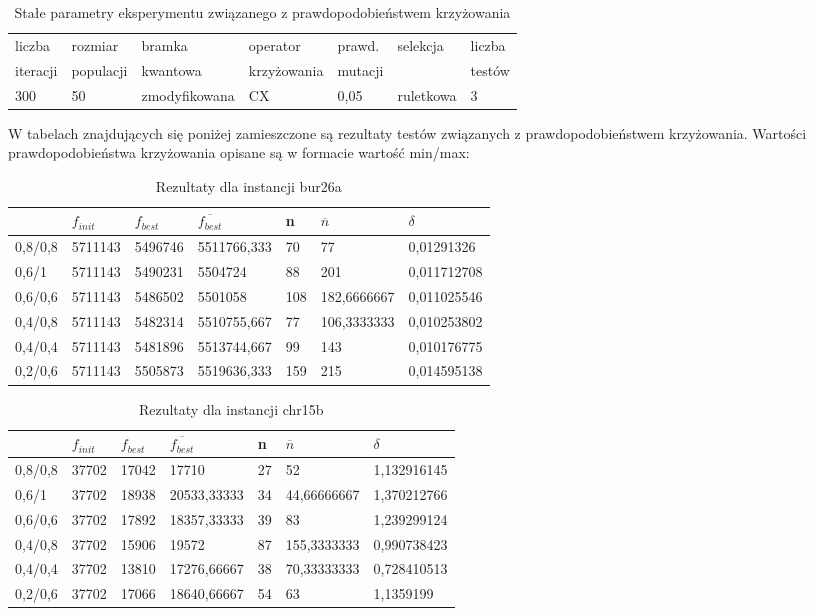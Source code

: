 \begin{table}[H]
\label{T3_params}
\begin{tabular}{l l l l l l l}
\hline
liczba & rozmiar & bramka & operator & prawd. & selekcja & liczba \\
iteracji & populacji & kwantowa & krzyżowania & mutacji & & testów \\
\hline
300 & 50 & zmodyfikowana & CX & 0,05 & ruletkowa & 3 \\
\hline
\end{tabular}
\caption{Stałe parametry eksperymentu związanego z prawdopodobieństwem krzyżowania}
\end{table}

W tabelach znajdujących się poniżej zamieszczone są rezultaty testów związanych z prawdopodobieństwem krzyżowania. Wartości prawdopodobieństwa krzyżowania opisane są w formacie wartość min/max:

\begin{table}[H]
\label{T3_bur26a}
\begin{tabular}{l l l l l l l}
\hline
 & $f_{init}$ & $f_{best}$ & $\overline{f_{best}}$ & n & $\overline{n}$ & $\delta$ \\
\hline
0,8/0,8 & 5711143 & 5496746 & 5511766,333 & 70 & 77 & 0,01291326\\
0,6/1 & 5711143 & 5490231 & 5504724 & 88 & 201 & 0,011712708\\
0,6/0,6 & 5711143 & 5486502 & 5501058 & 108 & 182,6666667 & 0,011025546\\
0,4/0,8 & 5711143 & 5482314 & 5510755,667 & 77 & 106,3333333 & 0,010253802\\
0,4/0,4 & 5711143 & 5481896 & 5513744,667 & 99 & 143 & 0,010176775\\
0,2/0,6 & 5711143 & 5505873 & 5519636,333 & 159 & 215 & 0,014595138\\
\hline
\end{tabular}
\caption{Rezultaty dla instancji bur26a}
\end{table}

\begin{table}[H]
\label{T3_chr15b}
\begin{tabular}{l l l l l l l}
\hline
 & $f_{init}$ & $f_{best}$ & $\overline{f_{best}}$ & n & $\overline{n}$ & $\delta$ \\
\hline
0,8/0,8 & 37702 & 17042 & 17710 & 27 & 52 & 1,132916145\\
0,6/1 & 37702 & 18938 & 20533,33333 & 34 & 44,66666667 & 1,370212766\\
0,6/0,6 & 37702 & 17892 & 18357,33333 & 39 & 83 & 1,239299124\\
0,4/0,8 & 37702 & 15906 & 19572 & 87 & 155,3333333 & 0,990738423\\
0,4/0,4 & 37702 & 13810 & 17276,66667 & 38 & 70,33333333 & 0,728410513\\
0,2/0,6 & 37702 & 17066 & 18640,66667 & 54 & 63 & 1,1359199\\
\hline
\end{tabular}
\caption{Rezultaty dla instancji chr15b}
\end{table}

